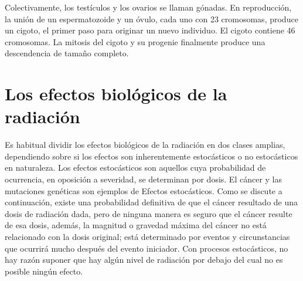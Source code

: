 \documentclass[]{article}
\begin{document}

Colectivamente, los testículos y los ovarios se llaman gónadas. En reproducción, la unión de un espermatozoide y un óvulo, cada uno con 23 cromosomas, produce un cigoto, el primer paso para originar un nuevo individuo. El cigoto contiene 46 cromosomas. La mitosis del cigoto y su progenie finalmente produce una descendencia de tamaño completo.\\



\section{Los efectos biológicos de la radiación}

Es habitual dividir los efectos biológicos de la radiación en dos clases amplias, dependiendo sobre si los efectos son inherentemente estocásticos o no estocásticos en naturaleza. Los efectos estocásticos son aquellos cuya probabilidad de ocurrencia, en oposición a severidad, se determinan por dosis. El cáncer y las mutaciones genéticas son ejemplos de Efectos estocásticos. Como se discute a continuación, existe una probabilidad definitiva de que el cáncer resultado de una dosis de radiación dada, pero de ninguna manera es seguro que el cáncer resulte de esa dosis, además, la magnitud o gravedad máxima del cáncer no está relacionado con la dosis original; está determinado por eventos y circunstancias que ocurrirá mucho después del evento iniciador. Con procesos estocásticos, no hay razón suponer que hay algún nivel de radiación por debajo del cual no es posible ningún efecto.\\
\end{document}
